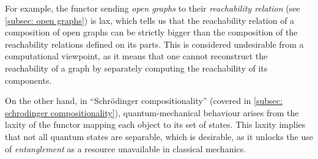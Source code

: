 For example, the functor sending \emph{open graphs} to their \emph{reachability relation} (see \autoref{subsec: open graphs}) is lax, which tells us that the reachability relation of a composition of open graphs can be strictly bigger than the composition of the reachability relations defined on its parts.
This is considered undesirable from a computational viewpoint, as it means that one cannot reconstruct the reachability of a graph by separately computing the reachability of its components.

On the other hand, in ``Schr\"odinger compositionality'' (covered in \autoref{subsec: schrodinger compositionality}), quantum-mechanical behaviour arises from the laxity of the functor mapping each object to its set of states.
This laxity implies that not all quantum states are separable, which is desirable, as it unlocks the use of \emph{entanglement} as a resource unavailable in classical mechanics.

